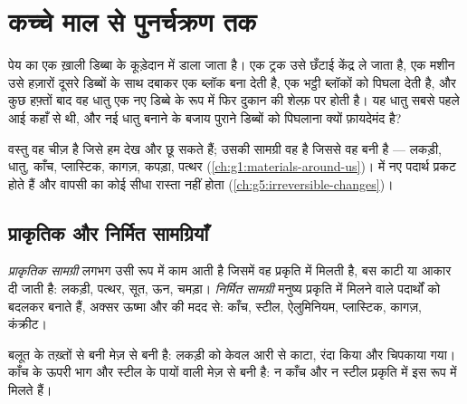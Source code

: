 \chapter{कच्चे माल से पुनर्चक्रण तक}\label{ch:g5:raw-materials-and-recycling}

पेय का एक ख़ाली डिब्बा  के कूड़ेदान में डाला जाता है। एक ट्रक उसे
छँटाई केंद्र ले जाता है, एक मशीन उसे हज़ारों दूसरे डिब्बों के साथ दबाकर एक
ब्लॉक बना देती है, एक भट्ठी ब्लॉकों को पिघला देती है, और कुछ हफ़्तों बाद
वह धातु एक नए डिब्बे के रूप में फिर दुकान की शेल्फ़ पर होती है। यह धातु
सबसे पहले आई कहाँ से थी, और नई धातु बनाने के बजाय पुराने डिब्बों को
पिघलाना क्यों फ़ायदेमंद है?

\begin{recall}
वस्तु वह चीज़ है जिसे हम देख और छू सकते हैं; उसकी सामग्री वह है जिससे
वह बनी है --- लकड़ी, धातु, काँच, प्लास्टिक, कागज़, कपड़ा, पत्थर
(\cref{ch:g1:materials-around-us})।  में नए पदार्थ प्रकट
होते हैं और वापसी का कोई सीधा रास्ता नहीं होता (\cref{ch:g5:irreversible-changes})।
\end{recall}

\section{प्राकृतिक और निर्मित सामग्रियाँ}

\begin{definition}[प्राकृतिक और निर्मित सामग्रियाँ]\label{def:g5:raw-materials-and-recycling:natural-material}
\emph{प्राकृतिक सामग्री} लगभग उसी रूप में काम
आती है जिसमें वह प्रकृति में मिलती है, बस काटी या आकार दी जाती है: लकड़ी,
पत्थर, सूत, ऊन, चमड़ा।
\emph{निर्मित सामग्री} मनुष्य प्रकृति में मिलने
वाले पदार्थों को बदलकर बनाते हैं, अक्सर ऊष्मा और  की
मदद से: काँच, स्टील, ऐलुमिनियम, प्लास्टिक, कागज़, कंक्रीट।
\end{definition}

\begin{example}[दो मेज़ें]\label{ex:g5:raw-materials-and-recycling:tables}
बलूत के तख़्तों से बनी मेज़  से बनी है: लकड़ी को केवल
आरी से काटा, रंदा किया और चिपकाया गया। काँच के ऊपरी भाग और स्टील के पायों
वाली मेज़  से बनी है: न काँच और न स्टील प्रकृति में
इस रूप में मिलते हैं।
\end{example}

